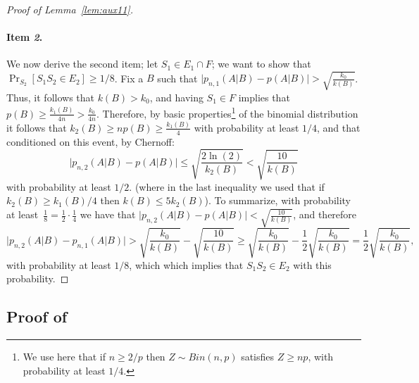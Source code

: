 \documentclass{article}
\begin{document}
\begin{proof}[Proof of Lemma~\ref{lem:aux11}]
\paragraph{Item {\it 2}.}
We now derive the second item;
let $S_1\in E_1\cap F$; we want to show that $\Pr_{S_2}[S_1S_2\in E_2]\geq 1/8$.
Fix a $B$ such that $\bigl\lvert p_{n,1}(A\vert B) - p(A\vert B) \bigr\rvert > \sqrt{\frac{k_0}{k(B)}}$.
Thus, it follows that $k(B) > k_0$, and having $S_1\in F$ implies that $p(B)\geq \frac{k_1(B)}{4n} > \frac{k_0}{4n}$.
Therefore, by basic properties\footnote{We use here that if $n\geq 2/p$ then $Z\sim Bin(n,p)$ satisfies $Z\geq np$,
with probability at least $1/4$.} of the binomial distribution it follows that $k_2(B) \geq np(B)\geq \frac{k_1(B)}{4}$ 
with probability at least $1/4$, and that conditioned on this event, by Chernoff:
\[ \bigl\lvert p_{n,2}(A \vert B) - p(A\vert B) \bigr\rvert \leq \sqrt{\frac{2\ln(2)}{k_2(B)}} < \sqrt{\frac{10}{k(B)}} \]
with probability at least $1/2$. 
(where in the last inequality we used that if $k_{2}(B)\geq k_1(B)/4$ then $k(B) \leq 5k_2(B)$).
To summarize, 
with probability at least~$\frac{1}{8}=\frac{1}{2}\cdot\frac{1}{4}$ we have that
$\bigl\lvert p_{n,2}(A \vert B) - p(A\vert B) \bigr\rvert < \sqrt{\frac{10}{k(B)}}$,
and therefore
\[
\bigl\lvert p_{n,2}(A \vert B) - p_{n,1}(A\vert B) \bigr\rvert > 
\sqrt{\frac{k_0}{k(B)}} - \sqrt{\frac{10}{k(B)}}\geq 
\sqrt{\frac{k_0}{k(B)}} - \frac{1}{2}\sqrt{\frac{k_0}{k(B)}}=
\frac{1}{2}\sqrt{\frac{k_0}{k(B)}},
\]
with probability at least $1/8$, which which implies that $S_1S_2\in E_2$ with this probability.
\end{proof}


\subsection{Proof of }
\end{document}
